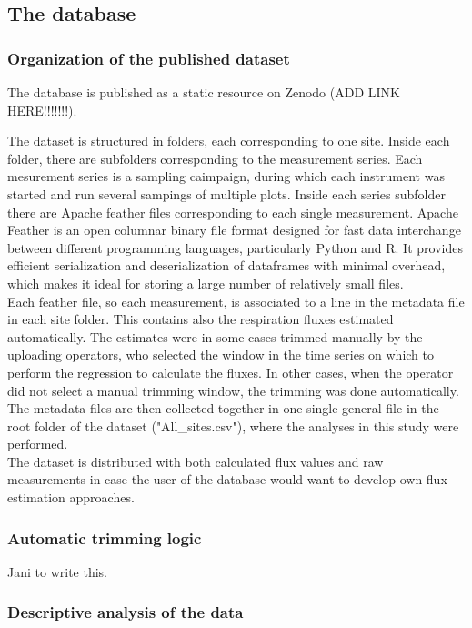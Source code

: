 \documentclass[12pt,a4paper]{article}
\begin{document}
\subsection{The database}

\subsubsection{Organization of the published dataset}
The database is published as a static resource on Zenodo (ADD LINK HERE!!!!!!!).

The dataset is structured in folders, each corresponding to one site. Inside each folder, there are subfolders corresponding to the measurement series. Each mesurement series is a sampling caimpaign, during which each instrument was started and run several sampings of multiple plots.
Inside each series subfolder there are Apache feather files corresponding to each single measurement. 
Apache Feather is an open columnar binary file format designed for fast data interchange between different programming languages, particularly Python and R. It provides efficient serialization and deserialization of dataframes with minimal overhead, 
which makes it ideal for storing a large number of relatively small files.\\

Each feather file, so each measurement, is associated to a line in the metadata file in each site folder. This contains also the respiration fluxes estimated automatically. The estimates were in some cases trimmed manually by the uploading operators, who selected the window in the time series on which to perform the regression to calculate the fluxes. In other cases, when the operator did not select a manual trimming window, the trimming was done automatically.
The metadata files are then collected together in one single general file in the root folder of the dataset ("All_sites.csv"), where the analyses in this study were performed.\\

The dataset is distributed with both calculated flux values and raw measurements in case the user of the database would want to develop own flux estimation approaches.

\subsubsection{Automatic trimming logic}
Jani to write this.


\subsubsection{Descriptive analysis of the data}
\end{document}
